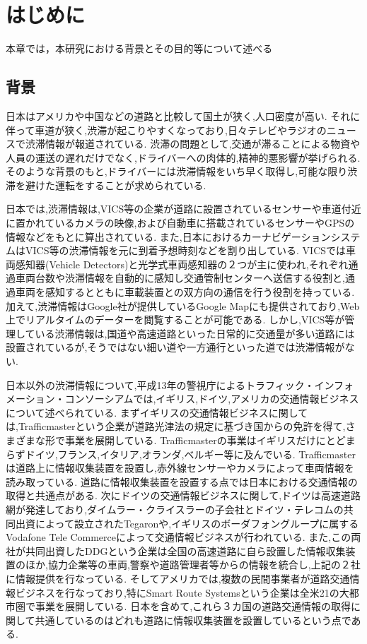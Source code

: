 \chapter{はじめに}
本章では，本研究における背景とその目的等について述べる
\section{背景}
日本はアメリカや中国などの道路と比較して国土が狭く,人口密度が高い.
それに伴って車道が狭く,渋滞が起こりやすくなっており,日々テレビやラジオのニュースで渋滞情報が報道されている.
渋滞の問題として,交通が滞ることによる物資や人員の運送の遅れだけでなく,ドライバーへの肉体的,精神的悪影響が挙げられる.
そのような背景のもと,ドライバーには渋滞情報をいち早く取得し,可能な限り渋滞を避けた運転をすることが求められている.

日本では,渋滞情報は,VICS等の企業が道路に設置されているセンサーや車道付近に置かれているカメラの映像,および自動車に搭載されているセンサーやGPSの情報などをもとに算出されている.
また,日本におけるカーナビゲーションシステムはVICS等の渋滞情報を元に到着予想時刻などを割り出している.
VICSでは車両感知器(Vehicle Detectors)と光学式車両感知器の２つが主に使われ,それぞれ通過車両台数や渋滞情報を自動的に感知し交通管制センターへ送信する役割と,通過車両を感知するとともに車載装置との双方向の通信を行う役割を持っている.
加えて,渋滞情報はGoogle社が提供しているGoogle Mapにも提供されており,Web上でリアルタイムのデーターを閲覧することが可能である.
しかし,VICS等が管理している渋滞情報は,国道や高速道路といった日常的に交通量が多い道路には設置されているが,そうではない細い道や一方通行といった道では渋滞情報がない.

日本以外の渋滞情報について,平成13年の警視庁によるトラフィック・インフォメーション・コンソーシアムでは,イギリス,ドイツ,アメリカの交通情報ビジネスについて述べられている\cite{traffic_buisiness}.
まずイギリスの交通情報ビジネスに関しては,Trafficmasterという企業が道路光津法の規定に基づき国からの免許を得て,さまざまな形で事業を展開している.
Trafficmasterの事業はイギリスだけにとどまらずドイツ,フランス,イタリア,オランダ,ベルギー等に及んでいる.
Trafficmasterは道路上に情報収集装置を設置し,赤外線センサーやカメラによって車両情報を読み取っている.
道路に情報収集装置を設置する点では日本における交通情報の取得と共通点がある.
次にドイツの交通情報ビジネスに関して,ドイツは高速道路網が発達しており,ダイムラー・クライスラーの子会社とドイツ・テレコムの共同出資によって設立されたTegaronや,イギリスのボーダフォングループに属するVodafone Tele Commerceによって交通情報ビジネスが行われている.
また,この両社が共同出資したDDGという企業は全国の高速道路に自ら設置した情報収集装置のほか,協力企業等の車両,警察や道路管理者等からの情報を統合し,上記の２社に情報提供を行なっている.
そしてアメリカでは,複数の民間事業者が道路交通情報ビジネスを行なっており,特にSmart Route Systemsという企業は全米21の大都市圏で事業を展開している.
日本を含めて,これら３カ国の道路交通情報の取得に関して共通しているのはどれも道路に情報収集装置を設置しているという点である.


